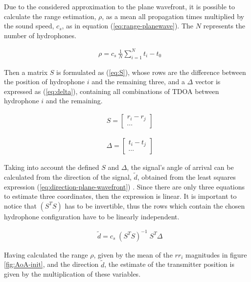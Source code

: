Due to the considered approximation to the plane wavefront, it is possible to calculate the range estimation, $\rho$, as a mean all propagation times multiplied by the sound speed, $c_s$, as in equation (\ref{eq:range-planewave}). The $N$ represents the number of hydrophones.

\begin{eqnarray}
& \rho = c_s\ \frac{1}{N} \displaystyle\sum_{i=1}^{N} t_{i} - t_0
\label{eq:range-planewave}
\end{eqnarray}

Then a matrix $S$ is formulated as (\ref{eq:S}), whose rows are the difference between the position of hydrophone $i$ and the remaining three, and a $\Delta$ vector is expressed as (\ref{eq:delta}), containing all combinations of TDOA between hydrophone $i$ and the remaining.

\begin{eqnarray}
	& S = 
	\begin{bmatrix}
		r_i - r_j \\
		\cdots 
	\end{bmatrix}
	\label{eq:S}
\end{eqnarray}

\begin{eqnarray}
	& \Delta = 
	\begin{bmatrix}
		t_i - t_j \\
		\cdots 
	\end{bmatrix}
	\label{eq:delta}
\end{eqnarray}

Taking into account the defined $S$ and $\Delta$, the signal's angle of arrival can be calculated from the direction of the signal, $\tilde{d}$, obtained from the least squares expression (\ref{eq:direction-plane-wavefront}) \cite{estim-plane-wavefront}. Since there are only three equations to estimate three coordinates, then the expression is linear. It is important to notice that $(S^TS)$ has to be invertible, thus the rows which contain the chosen hydrophone configuration have to be linearly independent.

\begin{eqnarray}
& \tilde{d} = c_s \; (S^{T}S)^{-1} \; S^{T} \Delta
\label{eq:direction-plane-wavefront}
\end{eqnarray}

Having calculated the range $\rho$, given by the mean of the $rr_i$ magnitudes in figure \ref{fig:AoA-init}, and the direction $\tilde{d}$, the estimate of the transmitter position is given by the multiplication of these variables.

